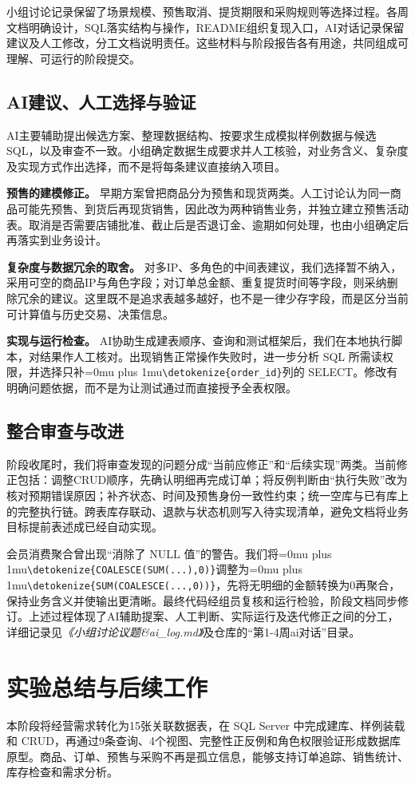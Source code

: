 \documentclass{SYSUReport}
\newcommand{\code}[1]{\begingroup\Urlmuskip=0mu plus 1mu\expandafter\nolinkurl\expandafter{\detokenize{#1}}\endgroup}
\newcommand{\docref}[1]{\textit{《#1》}}
\begin{document}
小组讨论记录保留了场景规模、预售取消、提货期限和采购规则等选择过程。各周文档明确设计，SQL落实结构与操作，README组织复现入口，AI对话记录保留建议及人工修改，分工文档说明责任。这些材料与阶段报告各有用途，共同组成可理解、可运行的阶段提交。

\subsection{AI建议、人工选择与验证}
AI主要辅助提出候选方案、整理数据结构、按要求生成模拟样例数据与候选 SQL，以及审查不一致。小组确定数据生成要求并人工核验，对业务含义、复杂度及实现方式作出选择，而不是将每条建议直接纳入项目。

\textbf{预售的建模修正。} 早期方案曾把商品分为预售和现货两类。人工讨论认为同一商品可能先预售、到货后再现货销售，因此改为两种销售业务，并独立建立预售活动表。取消是否需要店铺批准、截止后是否退订金、逾期如何处理，也由小组确定后再落实到业务设计。

\textbf{复杂度与数据冗余的取舍。} 对多IP、多角色的中间表建议，我们选择暂不纳入，采用可空的商品IP与角色字段；对订单总金额、重复提货时间等字段，则采纳删除冗余的建议。这里既不是追求表越多越好，也不是一律少存字段，而是区分当前可计算值与历史交易、决策信息。

\textbf{实现与运行检查。} AI协助生成建表顺序、查询和测试框架后，我们在本地执行脚本，对结果作人工核对。出现销售正常操作失败时，进一步分析 SQL 所需读权限，并选择只补\code{order_id}列的 SELECT。修改有明确问题依据，而不是为让测试通过而直接授予全表权限。

\subsection{整合审查与改进}
阶段收尾时，我们将审查发现的问题分成“当前应修正”和“后续实现”两类。当前修正包括：调整CRUD顺序，先确认明细再完成订单；将反例判断由“执行失败”改为核对预期错误原因；补齐状态、时间及预售身份一致性约束；统一空库与已有库上的完整执行链。跨表库存联动、退款与状态机则写入待实现清单，避免文档将业务目标提前表述成已经自动实现。

会员消费聚合曾出现“消除了 NULL 值”的警告。我们将\code{COALESCE(SUM(...),0)}调整为\code{SUM(COALESCE(...,0))}，先将无明细的金额转换为0再聚合，保持业务含义并使输出更清晰。最终代码经组员复核和运行检验，阶段文档同步修订。上述过程体现了AI辅助提案、人工判断、实际运行及迭代修正之间的分工，详细记录见\docref{小组讨论议题\&ai\_log.md}及仓库的“第1-4周ai对话”目录。

\section{实验总结与后续工作}
本阶段将经营需求转化为15张关联数据表，在 SQL Server 中完成建库、样例装载和 CRUD，再通过9条查询、4个视图、完整性正反例和角色权限验证形成数据库原型。商品、订单、预售与采购不再是孤立信息，能够支持订单追踪、销售统计、库存检查和需求分析。
\end{document}
